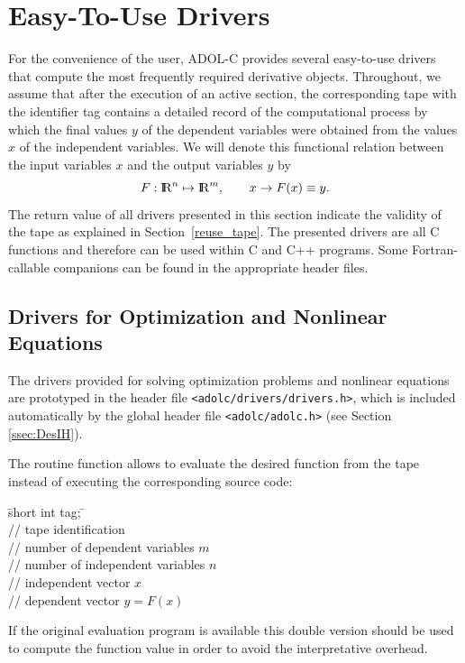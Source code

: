 \documentclass[11pt,twoside]{article}
\newcommand{\R}{{ {\rm I} \kern -.225em {\rm R} }}
\begin{document}
\section{Easy-To-Use Drivers}
\label{drivers}
%
For the convenience of the user, ADOL-C provides several
easy-to-use drivers that compute the most frequently required
derivative objects. Throughout, we assume that after the execution of an
active section, the corresponding tape with the identifier {\sf tag}
contains a detailed record of the computational process by which the
final values $y$ of the dependent variables were obtained from the
values $x$ of the independent variables. We will denote this functional
relation between the input variables $x$ and the output variables $y$ by
\[
F : \R^n \mapsto \R^m, \qquad x \rightarrow F(x) \equiv y.
\]
The return value of all drivers presented in this section
indicate the validity of the tape as explained in Section~\ref{reuse_tape}.
The presented drivers are all C functions and therefore can be used within
C and C++ programs. Some Fortran-callable companions can be found
in the appropriate header files. 
%
\subsection{Drivers for Optimization and Nonlinear Equations}
%
\label{optdrivers}
%
The drivers provided for solving optimization problems and nonlinear
equations are prototyped in the header file \verb=<adolc/drivers/drivers.h>=,
which is included automatically by the global header file \verb=<adolc/adolc.h>=
(see Section \ref{ssec:DesIH}). 

The routine {\sf function} allows to evaluate the desired function from 
the tape instead of executing the corresponding source code:
%
\begin{tabbing}
\hspace{0.5in}\={\sf short int tag;} \hspace{1.1in}\= \kill    %
\\
         \> // tape identification \\
                 \> // number of dependent variables $m$\\
                 \> // number of independent variables $n$\\
           \> // independent vector $x$ \\
           \> // dependent vector $y=F(x)$ 
\end{tabbing}
%
If the original evaluation program is available this double version 
should be used to compute the function value in order to avoid the
interpretative overhead.  
\end{document}
